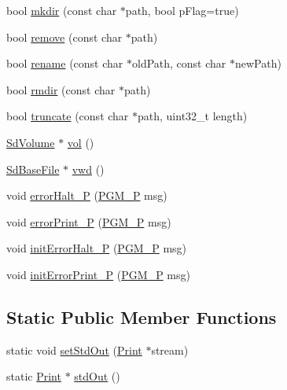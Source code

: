 \begin{DoxyCompactItemize}
\item 
bool \hyperlink{class_sd_fat_a11f4d9363a6e15b63119b97f4f0d36ff}{mkdir} (const char $\ast$path, bool p\-Flag=true)
\item 
bool \hyperlink{class_sd_fat_a46bf284f6c0bf88215a0e137add1e731}{remove} (const char $\ast$path)
\item 
bool \hyperlink{class_sd_fat_ad03015888b864c21b0f42ba09011efd5}{rename} (const char $\ast$old\-Path, const char $\ast$new\-Path)
\item 
bool \hyperlink{class_sd_fat_a7a1abc5178a42cdc882a1d12167f31af}{rmdir} (const char $\ast$path)
\item 
bool \hyperlink{class_sd_fat_adc3d5de76cc88efabd490bf830d445cb}{truncate} (const char $\ast$path, uint32\-\_\-t length)
\item 
\hyperlink{class_sd_volume}{Sd\-Volume} $\ast$ \hyperlink{class_sd_fat_a20e558523fde8b36ef1085018c270e0a}{vol} ()
\item 
\hyperlink{class_sd_base_file}{Sd\-Base\-File} $\ast$ \hyperlink{class_sd_fat_ad8a32a2789b135cc0fafc9964cfb2d31}{vwd} ()
\item 
void \hyperlink{class_sd_fat_afff7768f7b2f9e4f3b716e013d214d06}{error\-Halt\-\_\-\-P} (\hyperlink{_sd_base_file_8h_a963f816fc88a5d8479c285ed4c630229}{P\-G\-M\-\_\-\-P} msg)
\item 
void \hyperlink{class_sd_fat_a991adb9c8255a4de98125834571da062}{error\-Print\-\_\-\-P} (\hyperlink{_sd_base_file_8h_a963f816fc88a5d8479c285ed4c630229}{P\-G\-M\-\_\-\-P} msg)
\item 
void \hyperlink{class_sd_fat_ad7163f8ffb5ea2a3adc4c76c4bbc8a00}{init\-Error\-Halt\-\_\-\-P} (\hyperlink{_sd_base_file_8h_a963f816fc88a5d8479c285ed4c630229}{P\-G\-M\-\_\-\-P} msg)
\item 
void \hyperlink{class_sd_fat_a408a9d1360c8288e25403cdc84380c22}{init\-Error\-Print\-\_\-\-P} (\hyperlink{_sd_base_file_8h_a963f816fc88a5d8479c285ed4c630229}{P\-G\-M\-\_\-\-P} msg)
\end{DoxyCompactItemize}
\subsection*{Static Public Member Functions}
\begin{DoxyCompactItemize}
\item 
static void \hyperlink{class_sd_fat_a625a8635c2db7a668fc93f82766688f9}{set\-Std\-Out} (\hyperlink{class_print}{Print} $\ast$stream)
\item 
static \hyperlink{class_print}{Print} $\ast$ \hyperlink{class_sd_fat_a957df3529dafdd6ed3e17b23b4efbf27}{std\-Out} ()
\end{DoxyCompactItemize}
